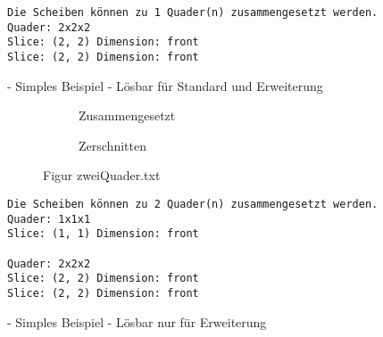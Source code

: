 \documentclass[a4paper,10pt,ngerman]{scrartcl}
\newcommand{\simplecube}[8]%
{
    \begin{scope}[shift={#1}]
        \fill[gray!40,canvas is yz plane at x=#2, opacity=#8] (0,0) rectangle (#3,#4);
        \fill[gray!10,canvas is xz plane at y=#3, opacity=#8] (0,0) rectangle (#2,#4);
        \fill[white  ,canvas is xy plane at z=#4, opacity=#8] (0,0) rectangle (#2,#3);
        \foreach\i/\j in {0/1, 1/1, 1/0}
            {
            \draw[line#5] (0,#3*\i,#4*\j) --++ (#2,0,0);
            \draw[line#6] (#2*\i,0,#4*\j) --++ (0,#3,0);
            \draw[line#7] (#2*\i,#3*\j,0) --++ (0,0,#4);
        }
    \end{scope}
}
\newcommand{\unsolvedSquare}[4]%
{
    \begin{scope}[shift={#1}]
        \simplecube{(0,     0,      0)}     {1}{2}{2}   {a}{a}{a}   {1}
        \simplecube{(1+#4,   0,      0))}    {1}{2}{2}   {a}{a}{a}   {1}
        \simplecube{(2+2*#4,   0,      0))}    {1}{1}{1}   {a}{a}{a}   {1}
    \end{scope}
}
\begin{document}
    \begin{lstlisting}[frame=single, title=Programmausgabe kleinerWuerfel.txt, breaklines=true,label={lst:lstlisting3}]
Die Scheiben können zu 1 Quader(n) zusammengesetzt werden.
Quader: 2x2x2
Slice: (2, 2) Dimension: front
Slice: (2, 2) Dimension: front
    \end{lstlisting}

    - Simples Beispiel
    - Lösbar für Standard und Erweiterung


    \begin{figure}[H]
        \centering
        \def\a{3.2}
        \def\b{1.2}
        \begin{subfigure}[b]{0.45\textwidth}
            \centering %
            \caption{Zusammengesetzt}\label{fig:figA3}
        \end{subfigure}
        \begin{subfigure}[b]{0.45\textwidth}
            \centering %
            \caption{Zerschnitten}\label{fig:figB3}
        \end{subfigure}
        \caption{Figur zweiQuader.txt}\label{fig:figAB3}
    \end{figure}

    \begin{lstlisting}[frame=single, title=Programmausgabe zweiQuader.txt, breaklines=true,label={lst:lstlisting4}]
Die Scheiben können zu 2 Quader(n) zusammengesetzt werden.
Quader: 1x1x1
Slice: (1, 1) Dimension: front

Quader: 2x2x2
Slice: (2, 2) Dimension: front
Slice: (2, 2) Dimension: front
    \end{lstlisting}

    - Simples Beispiel
    - Lösbar nur für Erweiterung

    \newpage
\end{document}
